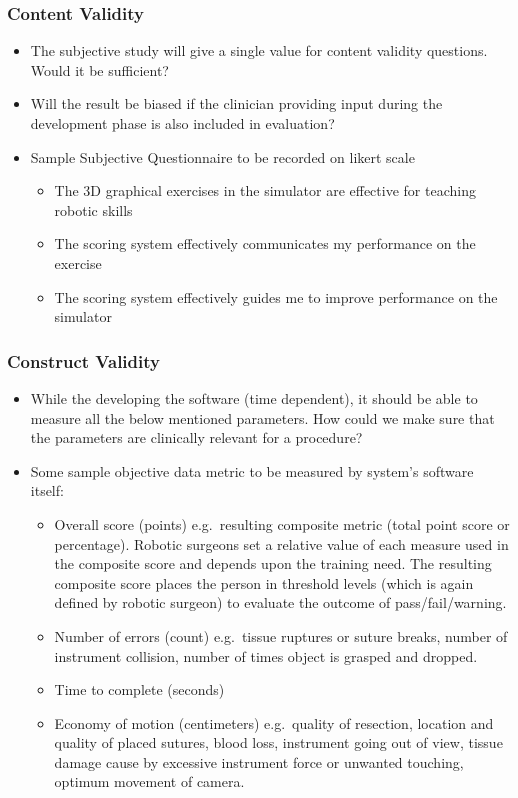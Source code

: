 \subsubsection{Content Validity}\label{sssec:content_validity}
\begin{itemize}
  \item The subjective study will give a single value for content validity questions. Would it be sufficient?
  \item Will the result be biased if the clinician providing input during the development phase is also included in evaluation?
  \item Sample Subjective Questionnaire to be recorded on likert scale
  \begin{itemize}
    \item The 3D graphical exercises in the simulator are effective for teaching robotic skills
    \item The scoring system effectively communicates my performance on the exercise
    \item The scoring system effectively guides me to improve performance on the simulator
  \end{itemize}
\end{itemize}

\subsubsection{Construct Validity}\label{sssec:construct_validity}
\begin{itemize}
  \item While the developing the software (time dependent), it should be able to measure all the below mentioned parameters. How could we make sure that the parameters are clinically relevant for a procedure?
  \item Some sample objective data metric to be measured by system's software itself:
  \begin{itemize}
    \item Overall score (points) e.g.\ resulting composite metric (total point score or percentage). Robotic surgeons set a relative value of each measure used in the composite score and depends upon the training need. The resulting composite score places the person in threshold levels (which is again defined by robotic surgeon) to evaluate the outcome of pass/fail/warning.
    \item Number of errors (count) e.g.\ tissue ruptures or suture breaks, number of instrument collision, number of times object is grasped and dropped.
    \item Time to complete (seconds)
    \item Economy of motion (centimeters) e.g.\ quality of resection, location and quality of placed sutures, blood loss, instrument going out of view, tissue damage cause by excessive instrument force or unwanted touching, optimum movement of camera.
  \end{itemize}
\end{itemize}

